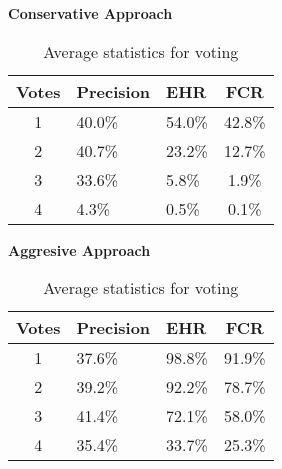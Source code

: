 \begin{table}[h]
  \centering
  \textbf{Conservative Approach}\vspace{2pt}
  \begin{tabularx}{\columnwidth}{cXXc}
    \toprule
    \textbf{Votes} & \textbf{Precision} & \textbf{EHR} & \textbf{FCR} \\
    \midrule
    1 & 40.0\% & 54.0\% & 42.8\% \\ \hline
    2 & 40.7\% & 23.2\% & 12.7\% \\ \hline
    3 & 33.6\% & 5.8\% & 1.9\% \\ \hline
    4 & 4.3\% & 0.5\% & 0.1\% \\ \hline
    \bottomrule
  \end{tabularx}

  \vspace{4pt}

  \textbf{Aggresive Approach}\vspace{2pt}
  \begin{tabularx}{\columnwidth}{cXXc}
    \toprule
    \textbf{Votes} & \textbf{Precision} & \textbf{EHR} & \textbf{FCR} \\
    \midrule
    1 & 37.6\% & 98.8\% & 91.9\% \\ \hline
    2 & 39.2\% & 92.2\% & 78.7\% \\ \hline
    3 & 41.4\% & 72.1\% & 58.0\% \\ \hline
    4 & 35.4\% & 33.7\% & 25.3\% \\ \hline
    \bottomrule
  \end{tabularx}

  \caption{Average statistics for voting}
  \label{[TABLE] avg_stats_voting}
\end{table}